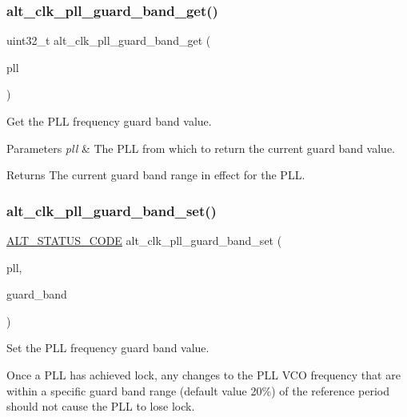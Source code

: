 \subsubsection{\texorpdfstring{alt\_clk\_pll\_guard\_band\_get()}{alt\_clk\_pll\_guard\_band\_get()}}
{\footnotesize\ttfamily uint32\+\_\+t alt\+\_\+clk\+\_\+pll\+\_\+guard\+\_\+band\+\_\+get (\begin{DoxyParamCaption}\item[{\mbox{\hyperlink{group__CLK__MGR_ga4cdb80e84284365fe3d47c2f8050b13d}{A\+L\+T\+\_\+\+C\+L\+K\+\_\+t}}}]{pll }\end{DoxyParamCaption})}

Get the P\+LL frequency guard band value.


\begin{DoxyParams}{Parameters}
{\em pll} & The P\+LL from which to return the current guard band value.\\
\hline
\end{DoxyParams}
\begin{DoxyReturn}{Returns}
The current guard band range in effect for the P\+LL. 
\end{DoxyReturn}
\mbox{\label{group__CLK__MGR__FREQ_gafc048f06e4287620cf70b639fbce8f6d}} 
\subsubsection{\texorpdfstring{alt\_clk\_pll\_guard\_band\_set()}{alt\_clk\_pll\_guard\_band\_set()}}
{\footnotesize\ttfamily \mbox{\hyperlink{hwlib_8h_abdb0d369f069723ca55d6c94bcaaaa12}{A\+L\+T\+\_\+\+S\+T\+A\+T\+U\+S\+\_\+\+C\+O\+DE}} alt\+\_\+clk\+\_\+pll\+\_\+guard\+\_\+band\+\_\+set (\begin{DoxyParamCaption}\item[{\mbox{\hyperlink{group__CLK__MGR_ga4cdb80e84284365fe3d47c2f8050b13d}{A\+L\+T\+\_\+\+C\+L\+K\+\_\+t}}}]{pll,  }\item[{uint32\+\_\+t}]{guard\+\_\+band }\end{DoxyParamCaption})}

Set the P\+LL frequency guard band value.

Once a P\+LL has achieved lock, any changes to the P\+LL V\+CO frequency that are within a specific guard band range (default value 20\%) of the reference period should not cause the P\+LL to lose lock.

